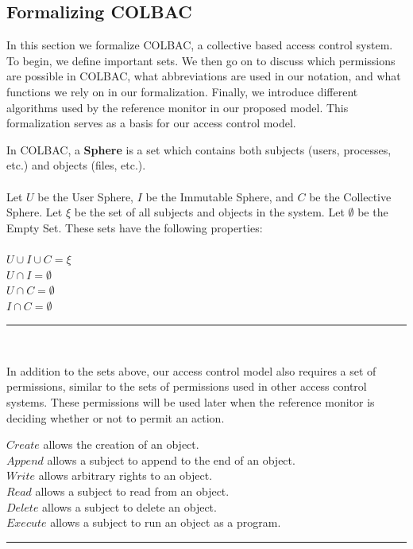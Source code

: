 \subsection{Formalizing COLBAC}
\label{sec:colbacformal}
In this section we formalize COLBAC, a collective based access control system.
To begin, we define important sets. We then go on to discuss which permissions
are possible in COLBAC, what abbreviations are used in our notation, and what
functions we rely on in our formalization. Finally, we introduce different
algorithms used by the reference monitor in our proposed model. This
formalization serves as a basis for our access control model.
\begin{definition}\label{def:spheres}
In COLBAC, a \textbf{Sphere} is a set which contains both subjects (users,
processes, etc.) and objects (files, etc.).\\
\mbox{}\\
Let $U$ be the User Sphere, $I$ be the Immutable Sphere, and $C$ be the
Collective Sphere. Let $\xi$ be the set of all subjects and objects in the
system. Let $\emptyset$ be the Empty Set. These sets have the following
properties:\\
\mbox{}\\
$U \cup I \cup C = \xi$\\
$U \cap I = \emptyset$\\
$U \cap C = \emptyset$\\
$I \cap C = \emptyset$\\
\hrule \mbox{}\\
\end{definition}

\noindent In addition to the sets above, our access control model also requires
a set of permissions, similar to the sets of permissions used in other access
control systems. These permissions will be used later when the reference monitor
is deciding whether or not to permit an action.

\begin{definition}\label{def:permissions}
$Create$ allows the creation of an object.\\
$Append$ allows a subject to append to the end of an object.\\
$Write$ allows arbitrary rights to an object. \\
$Read$ allows a subject to read from an object.\\
$Delete$ allows a subject to delete an object. \\
$Execute$ allows a subject to run an object as a program.\\
\hrule \mbox{}\\
\end{definition}

